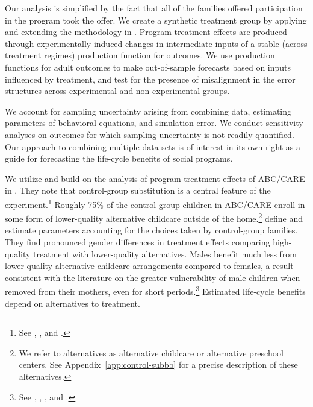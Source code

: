 Our analysis is simplified by the fact that all of the families offered participation in the program took the offer. We create a synthetic treatment group by applying and extending the methodology in \citet{Heckman_Pinto_etal_2013_PerryFactor}. Program treatment effects are produced through experimentally induced changes in intermediate inputs of a stable (across treatment regimes) production function for outcomes. We use production functions for adult outcomes to make out-of-sample forecasts based on inputs influenced by treatment, and test for the presence of misalignment in the error structures across experimental and non-experimental groups.

We account for sampling uncertainty arising from combining data, estimating parameters of behavioral equations, and simulation error. We conduct sensitivity analyses on outcomes for which sampling uncertainty is not readily quantified. Our approach to combining multiple data sets is of interest in its own right as a guide for forecasting the life-cycle benefits of social programs.

We utilize and build on the analysis of program treatment effects of ABC/CARE in \cite{Garcia_Heckman_Ziff_2017_Gender-Diff_UNPUBLISHED}. They note that control-group substitution is a central feature of the experiment.\footnote{See \cite{Heckman_1992_randomization}, \cite{Heckman_Hohmann_etal_2000_QJE}, and \cite{Kline_Walters_2016_QJE}.} Roughly 75\% of the control-group children in ABC/CARE enroll in some form of lower-quality alternative childcare outside of the home.\footnote{We refer to alternatives as alternative childcare or alternative preschool centers. See  Appendix~\ref{app:control-subbb} for a precise description of these alternatives.} \citet{Garcia_Heckman_Ziff_2017_Gender-Diff_UNPUBLISHED} define and estimate parameters accounting for the choices taken by control-group families. They find pronounced gender differences in treatment effects comparing high-quality treatment with lower-quality alternatives. Males benefit much less from lower-quality alternative childcare arrangements compared to females, a result consistent with the literature on the greater vulnerability of male children when removed from their mothers, even for short periods.\footnote{See \citet{Kottelenberg_Lehrer_2014_Gender-Effects}, \citet{Baker_Gruber_Milligan_2015_Noncog_Defects}, \cite{Schore_2017_IMHJ}, and \cite{Garcia_Heckman_Ziff_2017_Gender-Diff_UNPUBLISHED}.} Estimated life-cycle benefits depend on alternatives to treatment.

